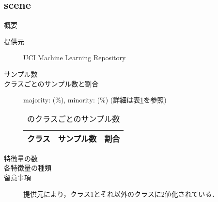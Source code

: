 \subsection{scene}
\begin{description}
    \item[概要] \cite{}
    \item[提供元] UCI Machine Learning Repository
    \item[サンプル数] 
    \item[クラスごとのサンプル数と割合] majority:  (\%), minority:  (\%) (詳細は表\ref{tab:}を参照)

        \begin{table}
            \centering
            \caption{のクラスごとのサンプル数}
            \label{tab:}
            \begin{tabular}{lrc} \hline
                \multicolumn{1}{c}{クラス}&
                \multicolumn{1}{c}{サンプル数}&
                \multicolumn{1}{c}{割合}\\
                \hline
                \hline

                \hline
            \end{tabular}
        \end{table}

    \item[特徴量の数] 
    \item[各特徴量の種類] \mbox{}
        
    \item[留意事項] 提供元により，クラス1とそれ以外のクラスに2値化されている．
\end{description}

